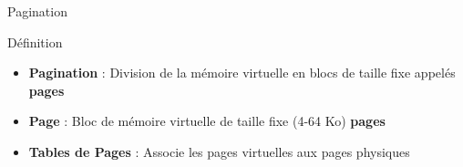 \documentclass[8pt]{beamer}
\begin{document}
\begin{frame}{Pagination}
    \begin{block}{D\'efinition}
        \begin{itemize}
            \item \textbf{Pagination} : Division de la mémoire virtuelle en
                  blocs de taille fixe appelés \textbf{pages}
            \item \textbf{Page} : Bloc de mémoire virtuelle de taille fixe
                  (4-64 Ko)
                  \textbf{pages}
            \item \textbf{Tables de Pages} : Associe les pages
                  virtuelles aux pages physiques
        \end{itemize}
    \end{block}
\end{frame}
\end{document}
